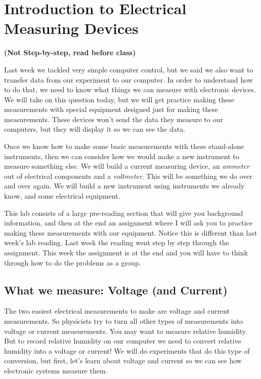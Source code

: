 \chapter{Introduction to Electrical Measuring Devices}
\LARGE \textbf{(Not Step-by-step, read before class)}
\normalsize
\vspace{0.25in}

Last week we tackled very simple computer control, but we said we also want to transfer data from our experiment to our computer. In order to understand how to do that, we need to know what things we can measure with electronic devices. We will take on this question today, but we will get practice making these measurements with special equipment designed just for making
these measurements. These devices won't send the data they measure to our computers, but they will display it so we can see the data.

Once we know how to make some basic measurements with these stand-alone instruments, then we can consider how we would make a new instrument to measure something else. We will build a current measuring device, an \emph{ammeter} out of electrical components and a \emph{voltmeter}. This will be something we do over and over again. We will build a new instrument using instruments we already know, and some electrical equipment.

This lab consists of a large pre-reading section that will give you background information, and then at the end an assignment where I will ask you to practice making these measurements with our equipment. Notice this is different than last week's lab reading. Last week the reading went step by step through the assignment. This week the assignment is at the end and you will have to think through how to do the problems as a group.

\section{What we measure: Voltage (and Current)\label{Voltage Measurement with Meter}}

The two easiest electrical measurements to make are voltage and current measurements. So physicists try to turn all other types of measurements into voltage or current measurements. You may want to measure relative humidity. But to record relative humidity on our computer we need to convert relative humidity into a voltage or current! We will do experiments that do this type of conversion, but first, let's learn about voltage and current so we can
see how electronic systems measure them.

